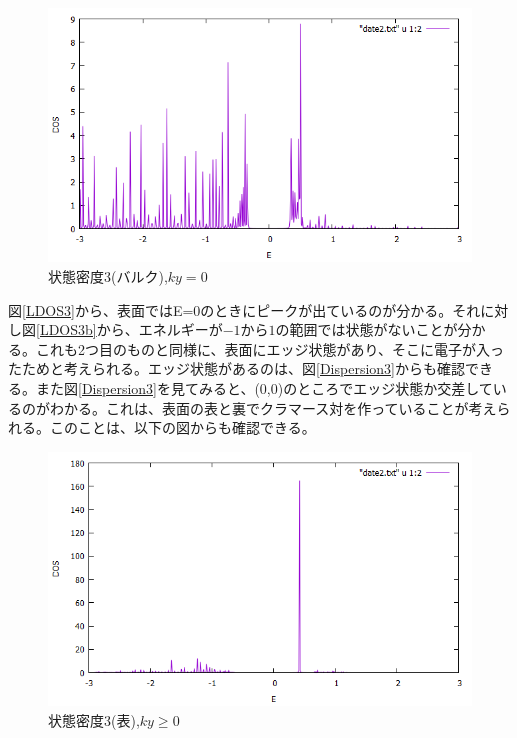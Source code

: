 \documentclass{jsarticle}
\begin{document}
            \begin{figure}[H]
                \centering
                \includegraphics[scale=0.5]{LDOS3b_bry.png}
                \caption{状態密度3(バルク),$ky=0$}
                \label{LDOS3b}
            \end{figure}
        
         	図\eqref{LDOS3}から、表面ではE=0のときにピークが出ているのが分かる。それに対し図\eqref{LDOS3b}から、エネルギーが$-1$から$1$の範囲では状態がないことが分かる。これも2つ目のものと同様に、表面にエッジ状態があり、そこに電子が入ったためと考えられる。エッジ状態があるのは、図\eqref{Dispersion3}からも確認できる。また図\eqref{Dispersion3}を見てみると、(0,0)のところでエッジ状態か交差しているのがわかる。これは、表面の表と裏でクラマース対を作っていることが考えられる。このことは、以下の図からも確認できる。
         	
         	\begin{figure}[H]
         		\centering
         		\includegraphics[scale=0.5]{LDOS3d_bry.png}
         		\caption{状態密度3(表),$ky\geq0$}
         		\label{LDOS3c}
         	\end{figure}
\end{document}
